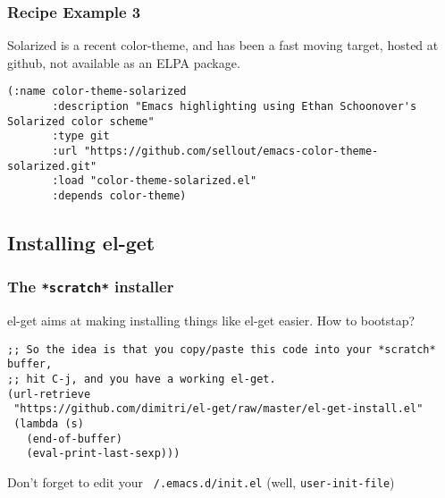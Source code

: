 \documentclass{beamer}
\begin{document}
\begin{frame}[fragile]
  \frametitle{Recipe Example 3}

  Solarized is a recent color-theme, and has been a fast moving target,
  hosted at github, not available as an ELPA package.

  \begin{verbatim}
(:name color-theme-solarized
       :description "Emacs highlighting using Ethan Schoonover's Solarized color scheme"
       :type git
       :url "https://github.com/sellout/emacs-color-theme-solarized.git"
       :load "color-theme-solarized.el"
       :depends color-theme)
  \end{verbatim}
\end{frame}



\subsection{Installing el-get}

\begin{frame}[fragile]
  \frametitle{The \texttt{*scratch*} installer}

  el-get aims at making installing things like el-get easier.  How to
  bootstap?

  \begin{verbatim}
;; So the idea is that you copy/paste this code into your *scratch* buffer,
;; hit C-j, and you have a working el-get.
(url-retrieve
 "https://github.com/dimitri/el-get/raw/master/el-get-install.el"
 (lambda (s)
   (end-of-buffer)
   (eval-print-last-sexp)))
  \end{verbatim}

  Don't forget to edit your \texttt{~/.emacs.d/init.el} (well,
  \texttt{user-init-file})
\end{frame}
\end{document}
